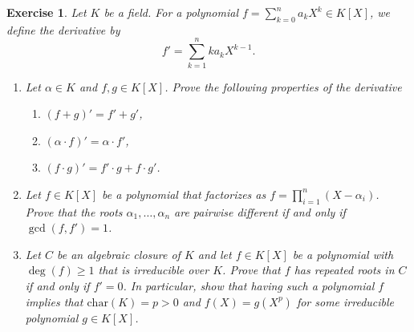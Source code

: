 \documentclass[a4paper,10pt,reqno]{amsart}
\newtheorem{ex}{Exercise}[section]
\begin{document}
\begin{ex}
\label{4.1}
    Let $K$ be a field. For a polynomial $f = \sum_{k=0}^na_kX^k \in K[X]$, we define the \emph{derivative} by
    \[
    f' = \sum_{k=1}^n ka_kX^{k-1}.
    \]
    \begin{enumerate}[label=(\roman*)]
        \item Let $\alpha \in K$ and $f,g \in K[X]$. Prove the following properties of the derivative
        \begin{enumerate}
            \item $(f + g)' = f' + g'$,
            \item $(\alpha \cdot f)' = \alpha \cdot f'$,
            \item $(f\cdot g)' = f'\cdot g + f \cdot g'$.
        \end{enumerate}
        \item Let $f \in K[X]$ be a polynomial that factorizes as $f = \prod_{i=1}^n (X - \alpha_i)$. Prove that the roots $\alpha_1, \ldots, \alpha_n$ are pairwise different if and only if $\gcd(f,f') = 1$.
        \item Let $C$ be an algebraic closure of $K$ and let $f \in K[X]$ be a polynomial with $\deg(f) \geq 1$ that is irreducible over $K$. Prove that $f$ has repeated roots in $C$ if and only if $f' = 0$.  In particular, show that 
        having such a polynomial $f$
        implies that $\mathrm{char}(K) = p > 0$ and $f(X) = g(X^p)$ for some irreducible polynomial $g \in K[X]$.
    \end{enumerate}
\end{ex}
\end{document}
